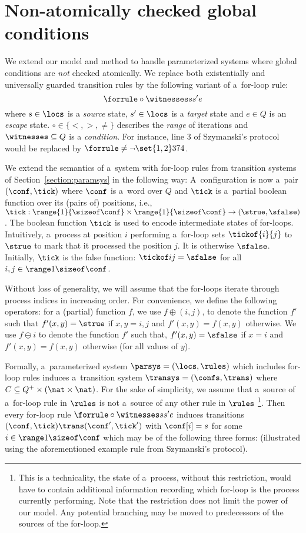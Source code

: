 \section{Non-atomically checked global conditions}
\label{section:non-atomic}
%
We extend our model and method to handle parameterized systems where
global conditions are \emph{not} checked atomically.
%
We replace both existentially and universally guarded transition rules
by the following variant of a~for-loop rule:
$$%
\forrule \circ \witnesses s {s'} e%
$$
where $s\in\locs$ is a \emph{source} state, $s'\in\locs$ is a
\emph{target} state and $e\in Q$ is an \emph{escape}
state. $\circ\in\{<,>,\neq\}$ describes the \emph{range} of iterations
and $\witnesses\subseteq Q$ is a \emph{condition}.
%
For instance, line 3 of Szymanski's protocol would be replaced by 
\mbox{$\forrule \neq {\neg\set{1,2}} 3 7 4$}.

We extend the semantics of a~system with for-loop rules from
transition systems of Section~\ref{section:paramsys} in the following
way:
%
A~configuration is now a~pair $(\conf,\tick)$ where $\conf$ is a~word
over $Q$ and $\tick$ is a~partial boolean function over its (pairs of)
positions, i.e.,
$\tick:{\range{1}{\sizeof\conf}\times\range{1}{\sizeof\conf}}\rightarrow(\strue,\sfalse)$.
%
The boolean function $\tick$ is used to encode intermediate states of
for-loops. Intuitively, a~process at position $i$ performing
a~for-loop sets $\tickof{i}{j}$ to $\strue$ to mark that it
processed the position $j$. It is otherwise
$\sfalse$.
%
Initially, $\tick$ is the false function: $\tickof i j = \sfalse$ for
all $i,j\in\range 1 {\sizeof \conf}$. 

Without loss of generality, we will assume that the for-loops iterate
through process indices in increasing order.
%
For convenience, we define the following operators: for a
(partial) %
function $f$, we use $f\oplus(i,j)$, to denote the function $f'$ such
that $f'(x,y) = \strue$ if $x,y=i,j$ and $f'(x,y) = f(x,y)$
otherwise. We use $f\ominus i$ to denote the function $f'$ such that,
$f'(x,y) = \sfalse$ if $x=i$ and $f'(x,y) = f(x,y)$ otherwise (for all
values of $y$).

Formally, a~parameterized system $\parsys=(\locs,\rules)$ which
includes for-loop rules induces a~transition system $\transys =
(\confs,\trans)$ where $C \subseteq Q^+\times (\nat\times\nat)$. %
For the sake of simplicity, we assume that a~source of a~for-loop rule
in $\rules$ is not a~source of any other rule in $\rules$%
%
\footnote{This is a technicality, the state of a~process, without this
  restriction, would have to contain additional information recording
  which for-loop is the process currently performing. %
  Note that the restriction does not limit the power of our model. %
  Any potential branching may be moved to predecessors of the sources
  of the for-loop.}. %
%
Then every for-loop rule $\forrule \circ \witnesses s {s'} e$ induces
transitions $(\conf,\tick) \trans (\conf',\tick')$ with $\conf [i] =
s$ for some $i\in\range 1 {\sizeof \conf}$ which may be of the
following three forms: (illustrated using the aforementioned example
rule from Szymanski's protocol).


